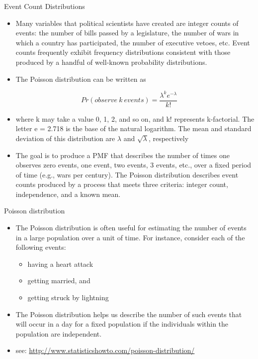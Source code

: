\documentclass[
  ignorenonframetext,
]{beamer}
\providecommand{\tightlist}{%
  \setlength{\itemsep}{0pt}\setlength{\parskip}{0pt}}
\begin{document}
\begin{frame}{Event Count Distributions}
\protect\hypertarget{event-count-distributions}{}

\begin{itemize}
\item
  Many variables that political scientists have created are integer
  counts of events: the number of bills passed by a legislature, the
  number of wars in which a country has participated, the number of
  executive vetoes, etc. Event counts frequently exhibit frequency
  distributions consistent with those produced by a handful of
  well-known probability distributions.
\item
  The Poisson distribution can be written as
\end{itemize}

\[Pr(observe \ k \ events)= \frac{\lambda^{k}e^{-\lambda}}{k!}\]

\begin{itemize}
\item
  where k may take a value 0, 1, 2, and so on, and k! represents
  k-factorial. The letter e = 2.718 is the base of the natural
  logarithm. The mean and standard deviation of this distribution are
  \(\lambda\) and \(\sqrt{\lambda}\), respectively
\item
  The goal is to produce a PMF that describes the number of times one
  observes zero events, one event, two events, 3 events, etc., over a
  fixed period of time (e.g., wars per century). The Poisson
  distribution describes event counts produced by a process that meets
  three criteria: integer count, independence, and a known mean.
\end{itemize}

\end{frame}

\begin{frame}{Poisson distribution}
\protect\hypertarget{poisson-distribution}{}

\begin{itemize}
\item
  The Poisson distribution is often useful for estimating the number of
  events in a large population over a unit of time. For instance,
  consider each of the following events:

  \begin{itemize}
  \tightlist
  \item
    having a heart attack
  \item
    getting married, and
  \item
    getting struck by lightning
  \end{itemize}
\item
  The Poisson distribution helps us describe the number of such events
  that will occur in a day for a fixed population if the individuals
  within the population are independent.
\item
  see: \url{http://www.statisticshowto.com/poisson-distribution/}
\end{itemize}

\end{frame}
\end{document}
